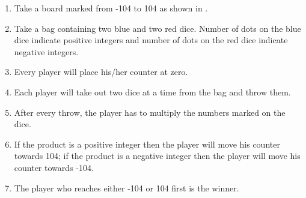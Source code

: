 \begin{enumerate}[label=\thesection.\arabic*, ref=\thesection.\theenumi]
	\item Take a board marked from -104 to 104 as shown in 
  .  
	\begin{table}[H]
  
  \caption{}
  \label{tab:game}
\end{table}
	\item Take a bag containing two blue and two red dice.  Number of dots on the blue dice indicate positive integers and number of dots on the red dice indicate negative integers.
	\item Every player will place his/her counter at zero.
	\item Each player will take out two dice at a time from the bag and throw them.
	\item After every throw, the player has to multiply the numbers marked on the dice.
	\item If the product is a positive integer then the player will move his counter towards 104; if the product is a negative integer then the player will move his counter towards -104.
	\item The player who reaches either -104 or 104 first is the winner.

\end{enumerate}
